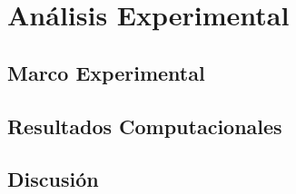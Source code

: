 \chapter{Análisis Experimental}\label{chapter:experiments}

\section{Marco Experimental}

\section{Resultados Computacionales}

\section{Discusión}
